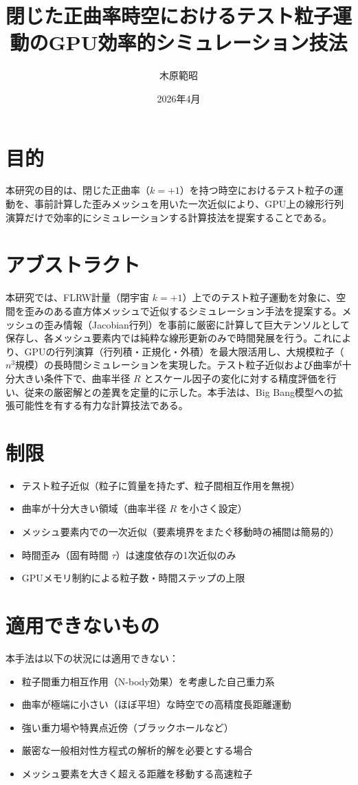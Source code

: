 \documentclass[11pt]{ltjsarticle}
\title{閉じた正曲率時空におけるテスト粒子運動のGPU効率的シミュレーション技法}
\author{木原範昭}
\date{2026年4月}
\begin{document}
\maketitle

\section{目的}
本研究の目的は、閉じた正曲率（\( k = +1 \)）を持つ時空におけるテスト粒子の運動を、事前計算した歪みメッシュを用いた一次近似により、GPU上の線形行列演算だけで効率的にシミュレーションする計算技法を提案することである。

\section{アブストラクト}
本研究では、FLRW計量（閉宇宙 \( k=+1 \)）上でのテスト粒子運動を対象に、空間を歪みのある直方体メッシュで近似するシミュレーション手法を提案する。メッシュの歪み情報（Jacobian行列）を事前に厳密に計算して巨大テンソルとして保存し、各メッシュ要素内では純粋な線形更新のみで時間発展を行う。これにより、GPUの行列演算（行列積・正規化・外積）を最大限活用し、大規模粒子（\( n^3 \)規模）の長時間シミュレーションを実現した。テスト粒子近似および曲率が十分大きい条件下で、曲率半径 \( R \) とスケール因子の変化に対する精度評価を行い、従来の厳密解との差異を定量的に示した。本手法は、Big Bang模型への拡張可能性を有する有力な計算技法である。

\section{制限}
\begin{itemize}
\item テスト粒子近似（粒子に質量を持たず、粒子間相互作用を無視）
\item 曲率が十分大きい領域（曲率半径 \( R \) を小さく設定）
\item メッシュ要素内での一次近似（要素境界をまたぐ移動時の補間は簡易的）
\item 時間歪み（固有時間 \( \tau \)）は速度依存の1次近似のみ
\item GPUメモリ制約による粒子数・時間ステップの上限
\end{itemize}

\section{適用できないもの}
本手法は以下の状況には適用できない：
\begin{itemize}
\item 粒子間重力相互作用（N-body効果）を考慮した自己重力系
\item 曲率が極端に小さい（ほぼ平坦）な時空での高精度長距離運動
\item 強い重力場や特異点近傍（ブラックホールなど）
\item 厳密な一般相対性方程式の解析的解を必要とする場合
\item メッシュ要素を大きく超える距離を移動する高速粒子
\end{itemize}
\end{document}
